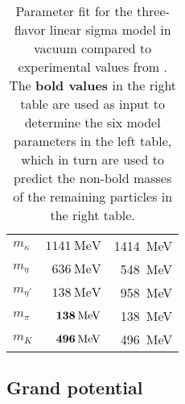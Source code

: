 \begin{table}
\begin{tabular}{ l r r }
	$m_\kappa$        & $\SI{1141}{\mega\electronvolt}$         & \SI{1414}{\mega\electronvolt}                    \\
	$m_\eta$          & $\SI{636}{\mega\electronvolt}$          & \SI{548}{\mega\electronvolt}                     \\
	$m_{\eta'}$       & $\SI{138}{\mega\electronvolt}$          & \SI{958}{\mega\electronvolt}                     \\
	$m_\pi$           & $\textbf{\SI{138}{\mega\electronvolt}}$ & \SI{138}{\mega\electronvolt}                     \\
	$m_K$             & $\textbf{\SI{496}{\mega\electronvolt}}$ & \SI{496}{\mega\electronvolt}                     \\
	\bottomrule
\end{tabular}
\caption{\label{tab:lsm3f:parameters}%
Parameter fit for the three-flavor linear sigma model in vacuum compared to experimental values from \cite{ref:pdg_review_2021}.
The \textbf{bold values} in the right table are used as input to determine the six model parameters in the left table,
which in turn are used to predict the non-bold masses of the remaining particles in the right table.
}
\end{table}


\subsection{Grand potential}

